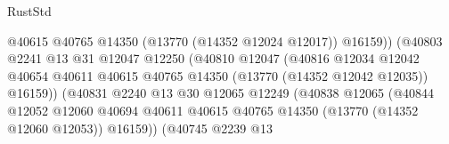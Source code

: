 \begin{lexlean}{RustStd}
\begin{coremodule}
                                                  @40615
                                                  @40765
                                                  @14350
                                                  (@13770 (@14352 @12024 @12017))
                                                  @16159))
                                              (@40803
                                                @2241
                                                @13
                                                @31
                                                @12047
                                                @12250
                                                (@40810
                                                  @12047
                                                  (@40816
                                                    @12034
                                                    @12042
                                                    @40654
                                                    @40611
                                                    @40615
                                                    @40765
                                                    @14350
                                                    (@13770 (@14352 @12042 @12035))
                                                    @16159))
                                                (@40831
                                                  @2240
                                                  @13
                                                  @30
                                                  @12065
                                                  @12249
                                                  (@40838
                                                    @12065
                                                    (@40844
                                                      @12052
                                                      @12060
                                                      @40694
                                                      @40611
                                                      @40615
                                                      @40765
                                                      @14350
                                                      (@13770 (@14352 @12060 @12053))
                                                      @16159))
                                                  (@40745
                                                    @2239
                                                    @13

\end{coremodule}
\end{lexlean}
